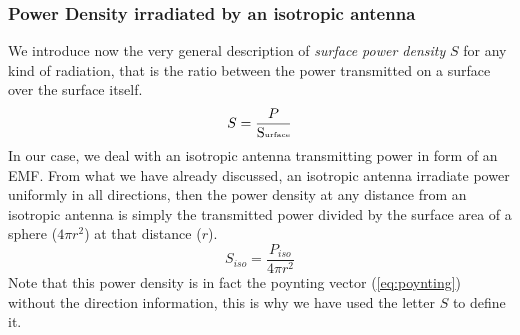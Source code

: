 \subsubsection*{Power Density irradiated by an isotropic antenna}
We introduce now the very general description of \emph{surface power density} $S$ for any kind of radiation, that is the ratio between the power transmitted on a surface over the surface itself.
\begin{equation}
    S=\frac{P}{\text{S\tiny{urface}}}
\end{equation}
In our case, we deal with an isotropic antenna transmitting power in form of an EMF. From what we have already discussed, an isotropic antenna irradiate power uniformly in all directions, then the power density at any distance from an isotropic antenna is simply the transmitted power divided by the surface area of a sphere ($4\pi r^2$) at that distance ($r$).
\begin{equation}
    S_{iso}=\frac{P_{iso}}{4\pi r^2}
\end{equation}
Note that this power density is in fact the poynting vector (\cref{eq:poynting}) without the direction information, this is why we have used the letter $S$ to define it.
